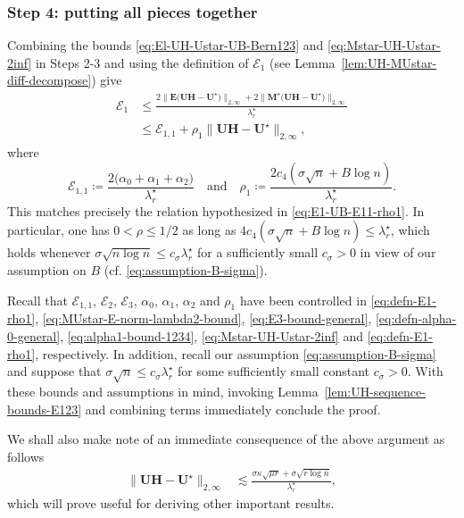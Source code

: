 \subsubsection{Step 4: putting all pieces together}

Combining the bounds \eqref{eq:El-UH-Ustar-UB-Bern123} and \eqref{eq:Mstar-UH-Ustar-2inf} in Steps 2-3 and using the definition of $\mathcal{E}_1$ (see Lemma~\ref{lem:UH-MUstar-diff-decompose}) give
%
\begin{align}
\mathcal{E}_{1} & \leq\frac{2\big\|\bm{E}\big(\bm{U}\bm{H}-\bm{U}^{\star}\big)\big\|_{2,\infty}+2\big\|\bm{M}^{\star}\big(\bm{U}\bm{H}-\bm{U}^{\star}\big)\big\|_{2,\infty}}{\lambda_{r}^{\star}} \nonumber \\
	& \leq\mathcal{E}_{1,1}+\rho_{1}\|\bm{U}\bm{H}-\bm{U}^{\star}\|_{2,\infty},
	\label{eq:E1-UB-general-1}
\end{align}
%
where
%
\begin{equation}
	\mathcal{E}_{1,1}\coloneqq\frac{2\big(\alpha_{0}+\alpha_{1}+\alpha_{2}\big)}{\lambda_{r}^{\star}}
	\quad\text{and}\quad
	\rho_{1}\coloneqq\frac{2c_{4}(\sigma\sqrt{n}+B\log n)}{\lambda_{r}^{\star}}.
	\label{eq:defn-E1-rho1}
\end{equation}
%
This matches precisely the relation hypothesized in \eqref{eq:E1-UB-E11-rho1}. In particular, one has $0<\rho\leq 1/2$
as long as $4c_4(\sigma \sqrt{n}+ B\log n) \leq \lambda_r^{\star}$, which holds whenever $\sigma \sqrt{n \log n}\leq c_{\sigma} \lambda_r^{\star}$ for a sufficiently small $c_{\sigma}>0$ in view of our assumption on $B$ (cf. \eqref{eq:assumption-B-sigma}).


Recall that $\mathcal{E}_{1,1}$, $\mathcal{E}_{2}$, $\mathcal{E}_{3}$, $\alpha_0$, $\alpha_1$, $\alpha_2$ and $\rho_1$ have been controlled in \eqref{eq:defn-E1-rho1}, \eqref{eq:MUstar-E-norm-lambda2-bound}, \eqref{eq:E3-bound-general}, \eqref{eq:defn-alpha-0-general}, \eqref{eq:alpha1-bound-1234}, \eqref{eq:Mstar-UH-Ustar-2inf} and \eqref{eq:defn-E1-rho1}, respectively.
In addition, recall our assumption \eqref{eq:assumption-B-sigma} and suppose that $\sigma{\sqrt{n}}\leq c_{\sigma}\lambda_{r}^{\star}$ for some sufficiently small constant $c_{\sigma}>0$.
With these bounds and assumptions in mind, invoking Lemma~\ref{lem:UH-sequence-bounds-E123} and combining terms immediately conclude the proof.



\begin{remark} We shall also make note of an immediate consequence of the above argument as follows
%
\begin{align}
	\big\|\bm{U}\bm{H}-\bm{U}^{\star}\big\|_{2,\infty}&\lesssim\frac{\sigma\kappa\sqrt{\mu r}+\sigma\sqrt{r\log n}}{\lambda_{r}^{\star}},
	\label{eq:UH-MUstar-Lambda-star-2inf}
\end{align}
%
which will prove useful for deriving other important results.
\end{remark}




